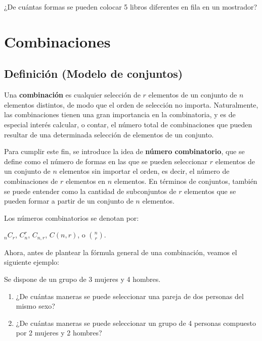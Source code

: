 \documentclass[12pt]{article}
\begin{document}
\begin{ejercicio}
    ¿De cuántas formas se pueden colocar 5 libros diferentes en fila en un mostrador?
\end{ejercicio}

\section{Combinaciones}

\subsection{Definición (Modelo de conjuntos)}

\begin{definicion}
    Una \textbf{combinación}  es cualquier selección de $r$ elementos de un conjunto de $n$ elementos distintos, de modo que el orden de selección no importa. Naturalmente, las combinaciones tienen una gran importancia en la combinatoria, y es de especial interés calcular, o contar, el número total de combinaciones que pueden resultar de una determinada selección de elementos de un conjunto.
\end{definicion}

\begin{definicion}
    Para cumplir este fin, se introduce la idea de \textbf{número combinatorio}, que se define como el número de formas en las que se pueden seleccionar $r$ elementos de un conjunto de $n$ elementos sin importar el orden, es decir, el número de combinaciones de $r$ elementos en $n$ elementos. En términos de conjuntos, también se puede entender como la cantidad de subconjuntos de $r$ elementos que se pueden formar a partir de un conjunto de $n$ elementos.
\end{definicion}

Los números combinatorios se denotan por:

\begin{center}
    $_{n}C_{r}$, $C^{r}_{n}$, $C_{n,r}$, $C(n,r)$, o $\binom{n}{r}$.
\end{center}

Ahora, antes de plantear la fórmula general de una combinación, veamos el siguiente ejemplo:

\begin{ejemplo}
    Se dispone de un grupo de 3 mujeres y 4 hombres.
    \renewcommand{\labelenumi}{\alph{enumi})}
    \begin{enumerate}
        \item ¿De cuántas maneras se puede seleccionar una pareja de dos personas del mismo sexo?
        \item ¿De cuántas maneras se puede seleccionar un grupo de 4 personas compuesto por 2 mujeres y 2 hombres?
    \end{enumerate}
\end{ejemplo}
\end{document}
